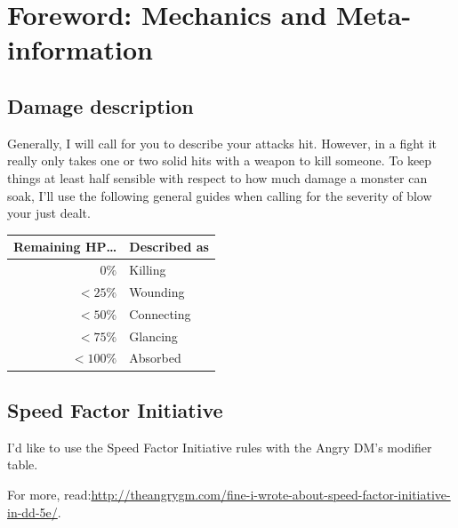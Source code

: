 \chapter{Foreword: Mechanics and Meta-information}

\section{Damage description}

Generally, I will call for you to describe your attacks hit.
However, in a fight it really only takes one or two solid hits with a weapon to kill someone.
To keep things at least half sensible with respect to how much damage a monster can soak, I'll use
  the following general guides when calling for the severity of blow your just dealt.

\begin{tabular}{|r|l|}
\hline
Remaining HP\dots & Described as \\
\hline
$0\%$    & Killing \\
$<25\%$  & Wounding \\
$<50\%$  & Connecting \\
$<75\%$  & Glancing \\
$<100\%$ & Absorbed \\
\hline
\end{tabular}

\newpage
\section{Speed Factor Initiative}

I'd like to use the Speed Factor Initiative rules with the Angry DM's modifier table.

For more, read:\newline\url{http://theangrygm.com/fine-i-wrote-about-speed-factor-initiative-in-dd-5e/}.

